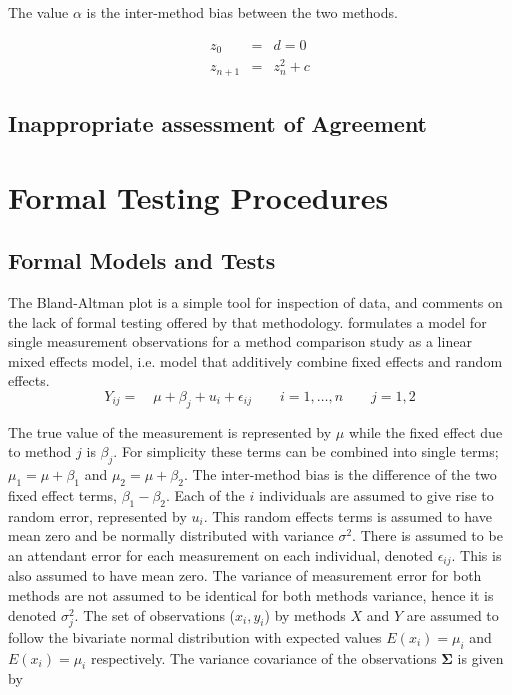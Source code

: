 \documentclass[12pt, a4paper]{report}
\theoremstyle{plain}
\theoremstyle{definition}
\theoremstyle{remark}
\begin{document}
	The value $\alpha$ is the inter-method bias between the two
	methods.
	
	\begin{eqnarray}
		z_0 &=& d = 0 \\
		z_{n+1} &=& z_n^2+c
	\end{eqnarray}
	
	\section{Inappropriate assessment of Agreement}
	\chapter{Formal Testing Procedures}
	\section{Formal Models and Tests}
	The Bland-Altman plot is a simple tool for inspection of data, and
	\citet{Kinsella} comments on the lack of formal testing offered by
	that methodology. \citet{Kinsella} formulates a model for
	single measurement observations for a method comparison study as a
	linear mixed effects model, i.e. model that additively combine
	fixed effects and random effects.
	\[
	Y_{ij} =\quad \mu + \beta_{j} + u_{i} + \epsilon_{ij} \qquad i = 1,\dots,n
	\qquad j=1,2\]
	
	The true value of the measurement is represented by $\mu$ while the fixed effect due to method $j$ is $\beta_{j}$.
	For simplicity these terms can be combined into single terms; $\mu_{1} = \mu+ \beta_{1}$ and $\mu_{2} = \mu + \beta_{2}$. The inter-method bias is the difference of the two fixed effect terms, $\beta_{1}-\beta_{2}$. Each of the $i$ individuals are assumed to give rise to random error, represented by $u_{i}$. This random effects terms is assumed to have mean zero and be normally distributed with variance $\sigma^2$. There is assumed to be an attendant error for each measurement on each individual, denoted $\epsilon_{ij}$. This is also assumed to have mean zero. The variance of measurement error for both methods are not assumed to be identical for both methods variance,  hence it is denoted $\sigma^2_{j}$. The set of observations ($x_{i},y_{i}$) by methods $X$ and $Y$ are assumed to follow the bivariate normal distribution with expected values $E(x_{i})= \mu_{i}$ and $E(x_{i})= \mu_{i}$ respectively. The variance covariance of the observations $\boldsymbol{\Sigma}$ is given by
	
\end{document}
